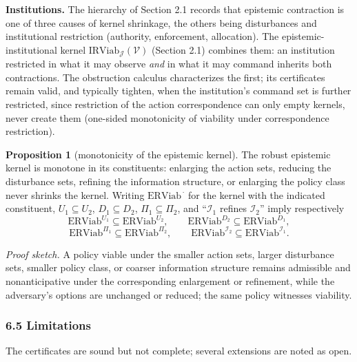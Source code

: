 \documentclass[10pt,twocolumn]{article}
\theoremstyle{definition}
\newtheorem{proposition}{Proposition}
\begin{document}
\textbf{Institutions.} The hierarchy of Section 2.1 records that
epistemic contraction is one of three causes of kernel shrinkage, the
others being disturbances and institutional restriction (authority,
enforcement, allocation). The epistemic-institutional kernel \(\mathrm{IRViab}_{\mathcal{J}}(\mathcal{V})\) (Section 2.1) combines them: an institution restricted in what it
may observe \emph{and} in what it may command inherits both
contractions. The obstruction calculus characterizes the first; its certificates remain valid, and typically tighten, when the institution's command set is further restricted, since restriction of
the action correspondence can only empty kernels, never create them
(one-sided monotonicity of viability under correspondence restriction).

\begin{proposition}[monotonicity of the epistemic kernel]\label{calc-prop:monotone}
The robust epistemic kernel is monotone in its constituents: enlarging
the action sets, reducing the disturbance sets, refining the information
structure, or enlarging the policy class never shrinks the kernel.
Writing \(\mathrm{ERViab}^{\,\cdot}\) for the kernel with the indicated
constituent, \(U_1\subseteq U_2\), \(D_1\subseteq D_2\),
\(\Pi_1\subseteq\Pi_2\), and ``\(\mathcal{I}_1\) refines
\(\mathcal{I}_2\)'' imply respectively
\[\mathrm{ERViab}^{U_1} \subseteq \mathrm{ERViab}^{U_2}, \qquad
\mathrm{ERViab}^{D_2} \subseteq \mathrm{ERViab}^{D_1},\]
\[\mathrm{ERViab}^{\Pi_1} \subseteq \mathrm{ERViab}^{\Pi_2}, \qquad
\mathrm{ERViab}^{\mathcal{I}_2} \subseteq \mathrm{ERViab}^{\mathcal{I}_1}.\]
\end{proposition}

\emph{Proof sketch.} A policy viable under the smaller action sets, larger disturbance sets, smaller policy class, or coarser information structure remains admissible and nonanticipative under the corresponding enlargement or refinement, while the adversary's options are unchanged or reduced; the same policy witnesses viability.

\subsubsection{6.5 Limitations}\label{calc-limitations}

The certificates are sound but not complete; several extensions are noted as open.
\end{document}
